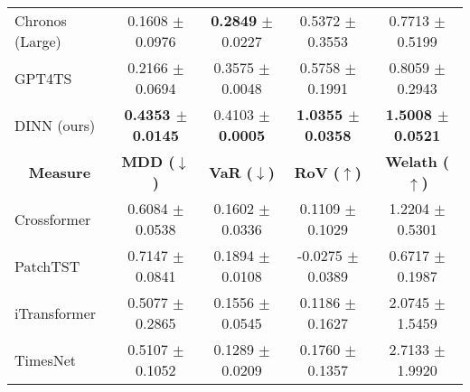 {\begin{tabular}{lcccc}
Chronos (Large)                      & 0.1608 $\pm$ 0.0976                                                      & \textbf{0.2849} $\pm$ 0.0227                                    & 0.5372 $\pm$ 0.3553                                 & 0.7713 $\pm$ 0.5199                                 \\
GPT4TS                               & 0.2166 $\pm$ 0.0694                                                      & 0.3575 $\pm$ 0.0048                                             & 0.5758 $\pm$ 0.1991                                 & 0.8059 $\pm$ 0.2943                                 \\
DINN (ours)                          & {\color[HTML]{000000} \textbf{0.4353 $\pm$ \color[HTML]{00009B} 0.0145}} & 0.4103 $\pm$ \textbf{\color[HTML]{00009B} 0.0005}                        & \textbf{1.0355 $\pm$ \color[HTML]{00009B} 0.0358}   & \textbf{1.5008 $\pm$ \color[HTML]{00009B} 0.0521}   \\ \hline
\multicolumn{1}{c}{\textbf{Measure}} & \textbf{MDD ($\downarrow$)}                                            & \textbf{VaR ($\downarrow$)}                                   & \textbf{RoV ($\uparrow$)}                         & \textbf{Welath ($\uparrow$)}                      \\ \hline
Crossformer                          & 0.6084 $\pm$ 0.0538                                                      & 0.1602 $\pm$ 0.0336                                             & 0.1109 $\pm$ 0.1029                                 & 1.2204 $\pm$ 0.5301                                 \\
PatchTST                             & 0.7147 $\pm$ 0.0841                                                      & 0.1894 $\pm$ 0.0108                                             & -0.0275 $\pm$ 0.0389                                & {\color[HTML]{000000} 0.6717 $\pm$ 0.1987}          \\
iTransformer                         & 0.5077 $\pm$ 0.2865                                                      & 0.1556 $\pm$ 0.0545                                             & 0.1186 $\pm$ 0.1627                                 & 2.0745 $\pm$ 1.5459                                 \\
TimesNet                             & 0.5107 $\pm$ 0.1052                                                      & 0.1289 $\pm$ 0.0209                                             & 0.1760 $\pm$ 0.1357                                 & 2.7133 $\pm$ 1.9920                                 \\

\end{tabular}}
